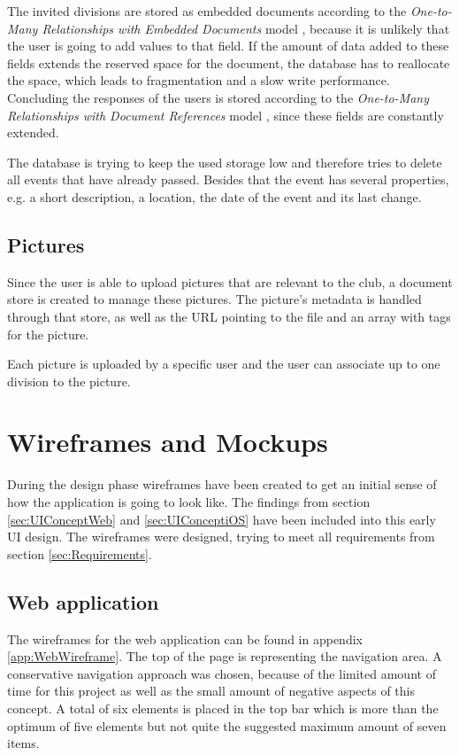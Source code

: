 The invited divisions are stored as embedded documents according to the \emph{One-to-Many Relationships with Embedded Documents} model \cite[p. 141]{Mongo:2014aa}, because it is unlikely that the user is going to add values to that field. If the amount of data added to these fields extends the reserved space for the document, the database has to reallocate the space, which leads to fragmentation and a slow write performance. Concluding the responses of the users is stored according to the \emph{One-to-Many Relationships with Document References} model \cite[p. 143]{Mongo:2014aa}, since these fields are constantly extended.

The database is trying to keep the used storage low and therefore tries to delete all events that have already passed. Besides that the event has several properties, e.g. a short description, a location, the date of the event and its last change.

\subsection{Pictures}
Since the user is able to upload pictures that are relevant to the club, a document store is created to manage these pictures. The picture's metadata is handled through that store, as well as the URL pointing to the file and an array with tags for the picture.

Each picture is uploaded by a specific user and the user can associate up to one division to the picture.

\section{Wireframes and Mockups}
\label{sec:Wireframes}

During the design phase wireframes have been created to get an initial sense of how the application is going to look like. The findings from section \vref{sec:UIConceptWeb} and \vref{sec:UIConceptiOS} have been included into this early \gls{UI} design. The wireframes were designed, trying to meet all requirements from section \vref{sec:Requirements}.

\subsection{Web application}

The wireframes for the web application can be found in appendix \vref{app:WebWireframe}. The top of the page is representing the navigation area. A conservative navigation approach was chosen, because of the limited amount of time for this project as well as the small amount of negative aspects of this concept. A total of six elements is placed in the top bar which is more than the optimum of five elements but not quite the suggested maximum amount of seven items.

